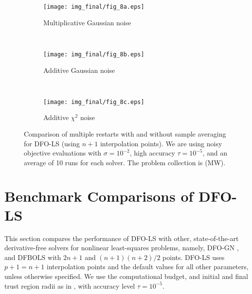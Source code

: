 \begin{figure}
	\centering
	\begin{subfigure}[b]{0.48\textwidth}
		\texttt{[image: img\_final/fig\_8a.eps]}
		\caption{Multiplicative Gaussian noise}
		\label{fig_restarts_avg_noise2_ubgsn_noisyf}
	\end{subfigure}
	~
	\begin{subfigure}[b]{0.48\textwidth}
		\texttt{[image: img\_final/fig\_8b.eps]}
		\caption{Additive Gaussian noise}
		\label{fig_restarts_avg_noise2_addgsn_noisyf}
	\end{subfigure}
	\\
	\begin{subfigure}[b]{0.48\textwidth}
		\texttt{[image: img\_final/fig\_8c.eps]}
		\caption{Additive $\chi^2$ noise}
		\label{fig_restarts_avg_noise2_addchisq_noisyf}
	\end{subfigure}
	\caption{Comparison of multiple restarts with and without sample averaging for DFO-LS (using $n+1$ interpolation points). We are using noisy objective evaluations with $\sigma=10^{-2}$, high accuracy $\tau=10^{-5}$, and an average of 10 runs for each solver. The problem collection is (MW).}
	\label{fig_restarts_avg_noise2}
\end{figure}

\section{Benchmark Comparisons of DFO-LS} \label{sec_dfols_benchmarking}

This section compares the performance of DFO-LS with other, state-of-the-art derivative-free solvers for nonlinear least-squares problems, namely, DFO-GN \cite{Cartis2017a}, and DFBOLS \cite{Zhang2010} with $2n+1$ and $(n+1)(n+2)/2$ points.
DFO-LS uses $p+1=n+1$ interpolation points and the default values for all other parameters, unless otherwise specified.
We use the computational budget, and initial and final trust region radii as in , with accuracy level $\tau=10^{-5}$.

